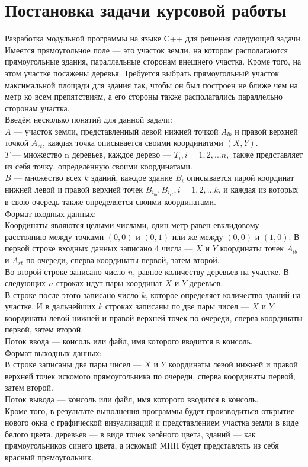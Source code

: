 \documentclass[a4paper,12pt]{article}
\begin{document}
\section{Постановка задачи курсовой работы}{
Разработка модульной программы на языке C++ для решения следующей задачи. Имеется прямоугольное поле — это участок земли, на котором располагаются прямоугольные здания, параллельные сторонам внешнего участка. Кроме того, на этом участке посажены деревья. Требуется выбрать прямоугольный участок максимальной площади для здания так, чтобы он был построен не ближе чем на метр ко всем препятствиям, а его стороны также располагались параллельно сторонам участка. \\
Введём несколько понятий для данной задачи:\\
$A$ — участок земли, представленный левой нижней точкой $A_{lb}$ и правой верхней точкой $A_{rt}$, каждая точка описывается своими координатами $(X,Y)$. \\$T$ — множество n деревьев, каждое дерево — $T_i, i=1,2,...n,$ также представляет из себя точку, определённую своими координатами.\\ $B$ — множество всех $k$ зданий, каждое здание $B_i$ описывается парой координат нижней левой и правой верхней точек $B_{i_{lb}}, B_{i_{rt}}, i=1,2,...k$,  и каждая из которых в свою очередь также определяется своими координатами.\\
Формат входных данных:\\
Координаты являются целыми числами, один метр равен евклидовому расстоянию между точками $(0,0)$ и $(0,1)$ или же между $(0,0)$ и $(1,0)$.
В первой строке входных данных записано 4 числа — $X$ и $Y$ координаты точек $A_{lb}$ и $A_{rt}$ по очереди, сперва координаты первой, затем второй.\\
Во второй строке записано число $n$, равное количеству деревьев на участке. В следующих $n$ строках идут пары координат $X$ и $Y$ деревьев. \\
В строке после этого записано число $k$, которое определяет количество зданий на участке. И в дальнейших $k$ строках записаны по две пары чисел — $X$ и $Y$ координаты левой нижней и правой верхней точек по очереди, сперва координаты первой, затем второй.\\
Поток ввода — консоль или файл, имя которого вводится в консоль.\\
Формат выходных данных: \\
В строке записаны две пары чисел — $X$ и $Y$ координаты левой нижней и правой верхней точек искомого прямоугольника по очереди, сперва координаты первой, затем второй.\\
Поток вывода — консоль или файл, имя которого вводится в консоль.\\
Кроме того, в результате выполнения программы будет производиться открытие нового окна с графической визуализаций и представлением участка земли в виде белого цвета, деревьев — в виде точек зелёного цвета, зданий — как прямоугольников синего цвета, а искомый МПП будет представлять из себя красный прямоугольник.
}
\end{document}

